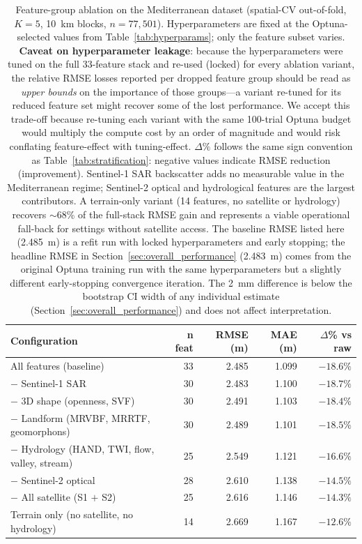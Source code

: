 \begin{table}[t]
\centering
\caption{Feature-group ablation on the Mediterranean dataset (spatial-CV out-of-fold, $K=5$, \SI{10}{\kilo\meter} blocks, $n = 77{,}501$). Hyperparameters are fixed at the Optuna-selected values from Table~\ref{tab:hyperparams}; only the feature subset varies. \textbf{Caveat on hyperparameter leakage}: because the hyperparameters were tuned on the full 33-feature stack and re-used (locked) for every ablation variant, the relative RMSE losses reported per dropped feature group should be read as \emph{upper bounds} on the importance of those groups---a variant re-tuned for its reduced feature set might recover some of the lost performance. We accept this trade-off because re-tuning each variant with the same 100-trial Optuna budget would multiply the compute cost by an order of magnitude and would risk conflating feature-effect with tuning-effect. $\Delta\%$ follows the same sign convention as Table~\ref{tab:stratification}: negative values indicate RMSE reduction (improvement). Sentinel-1 SAR backscatter adds no measurable value in the Mediterranean regime; Sentinel-2 optical and hydrological features are the largest contributors. A terrain-only variant (14 features, no satellite or hydrology) recovers $\sim$68\% of the full-stack RMSE gain and represents a viable operational fall-back for settings without satellite access. The baseline RMSE listed here (\SI{2.485}{\meter}) is a refit run with locked hyperparameters and early stopping; the headline RMSE in Section~\ref{sec:overall_performance} (\SI{2.483}{\meter}) comes from the original Optuna training run with the same hyperparameters but a slightly different early-stopping convergence iteration. The \SI{2}{\milli\meter} difference is below the bootstrap CI width of any individual estimate (Section~\ref{sec:overall_performance}) and does not affect interpretation.}
\label{tab:ablation}
\footnotesize
\begin{tabular}{lrrrr}
\toprule
\textbf{Configuration} & \textbf{n feat} & \textbf{RMSE (m)} & \textbf{MAE (m)} & \textbf{$\Delta$\% vs raw} \\
\midrule
All features (baseline)                                & 33 & 2.485 & 1.099 & $-18.6\%$ \\
$-$ Sentinel-1 SAR                                     & 30 & 2.483 & 1.100 & $-18.7\%$ \\
$-$ 3D shape (openness, SVF)                           & 30 & 2.491 & 1.103 & $-18.4\%$ \\
$-$ Landform (MRVBF, MRRTF, geomorphons)               & 30 & 2.489 & 1.101 & $-18.5\%$ \\
$-$ Hydrology (HAND, TWI, flow, valley, stream)        & 25 & 2.549 & 1.121 & $-16.6\%$ \\
$-$ Sentinel-2 optical                                 & 28 & 2.610 & 1.138 & $-14.5\%$ \\
$-$ All satellite (S1 $+$ S2)                          & 25 & 2.616 & 1.146 & $-14.3\%$ \\
Terrain only (no satellite, no hydrology)              & 14 & 2.669 & 1.167 & $-12.6\%$ \\
\bottomrule
\end{tabular}
\end{table}
